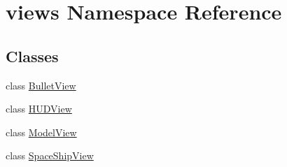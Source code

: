 \hypertarget{namespaceviews}{\section{views \-Namespace \-Reference}
\label{d8/db2/namespaceviews}
}
\subsection*{\-Classes}
\begin{DoxyCompactItemize}
\item 
class \hyperlink{classviews_1_1BulletView}{\-Bullet\-View}
\item 
class \hyperlink{classviews_1_1HUDView}{\-H\-U\-D\-View}
\item 
class \hyperlink{classviews_1_1ModelView}{\-Model\-View}
\item 
class \hyperlink{classviews_1_1SpaceShipView}{\-Space\-Ship\-View}
\end{DoxyCompactItemize}
